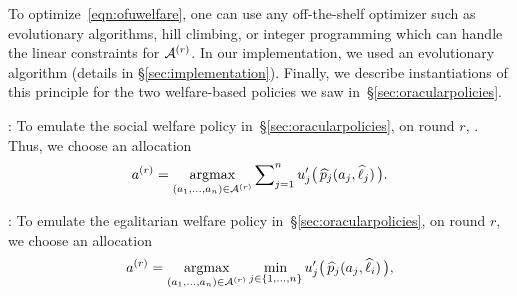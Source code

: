 To optimize~\eqref{eqn:ofuwelfare}, one can use any off-the-shelf optimizer such as
evolutionary algorithms, hill climbing, or integer programming which can handle the linear
constraints for $\mathcal{A}^{(r)}$.
In our implementation, we used an evolutionary algorithm (details in \S\ref{sec:implementation}).
Finally, we describe instantiations of this principle for the two welfare-based policies
we saw in~\S\ref{sec:oracularpolicies}.


:
To emulate the social welfare policy in~\S\ref{sec:oracularpolicies},
on round $r$, . Thus, we choose an allocation
\begin{align*}
a^{(r)}
       = \mathop{\mathrm{argmax}}_{(a_1,\dots,a_n)\in\mathcal{A}^{(r)}} \sum\nolimits_{j=1}^n u'_{j}\big(\,\widehat{p}_{j}(a_{j}, \widehat{\ell}_{j})\,\big).
\end{align*}


:
To emulate the egalitarian welfare policy in~\S\ref{sec:oracularpolicies},
on round $r$, we choose an allocation
\begin{align*}
a^{(r)}
       = \mathop{\mathrm{argmax}}_{(a_1,\dots,a_n)\in\mathcal{A}^{(r)}} \min_{j\in\{1,\dots,n\}} u'_{j}\big(\,\widehat{p}_{j}(a_{j}, \widehat{\ell}_{i})\,\big),
\end{align*}


